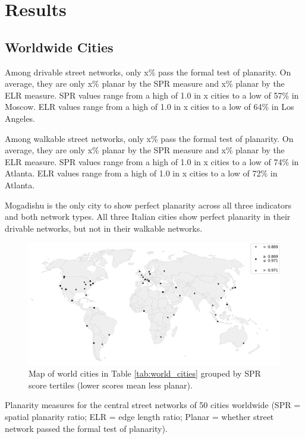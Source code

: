 \documentclass[Afour,sageh,times]{sagej}
\begin{document}
\section{Results}

\subsection{Worldwide Cities}

Among drivable street networks, only x\% pass the formal test of planarity. On average, they are only x\% planar by the SPR measure and x\% planar by the ELR measure. SPR values range from a high of 1.0 in x cities to a low of 57\% in Moscow. ELR values range from a high of 1.0 in x cities to a low of 64\% in Los Angeles.

Among walkable street networks, only x\% pass the formal test of planarity. On average, they are only x\% planar by the SPR measure and x\% planar by the ELR measure. SPR values range from a high of 1.0 in x cities to a low of 74\% in Atlanta. ELR values range from a high of 1.0 in x cities to a low of 72\% in Atlanta.

Mogadishu is the only city to show perfect planarity across all three indicators and both network types. All three Italian cities show perfect planarity in their drivable networks, but not in their walkable networks. 

\begin{figure}[htbp]
    \center
    \includegraphics[width=\textwidth]{world_map_phi_bw.png}
    \caption{Map of world cities in Table \ref{tab:world_cities} grouped by SPR score tertiles (lower scores mean less planar).}
    \label{fig:world_map_bw}
\end{figure}


\begin{table}[htbp]
\centering
\caption{Planarity measures for the central street networks of 50 cities worldwide (SPR = spatial planarity ratio; ELR = edge length ratio; Planar = whether street network passed the formal test of planarity).}
\label{tab:world_cities}

\end{table}
\end{document}
